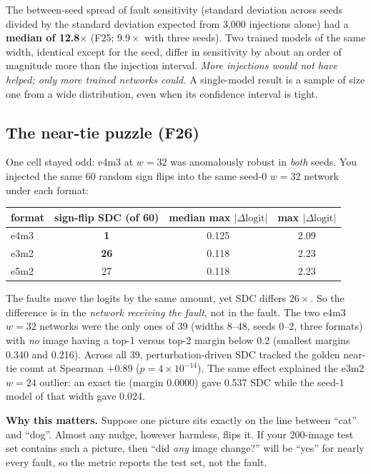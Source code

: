 The between-seed spread of fault sensitivity (standard deviation across seeds divided by the standard deviation expected from 3{,}000 injections alone) had a \textbf{median of 12.8$\times$} (F25; $9.9\times$ with three seeds). Two trained models of the same width, identical except for the seed, differ in sensitivity by about an order of magnitude more than the injection interval.
\emph{More injections would not have helped; only more trained networks could.} A single-model result is a sample of size one from a wide distribution, even when its confidence interval is tight.

\subsection{The near-tie puzzle (F26)}
One cell stayed odd: e4m3 at $w=32$ was anomalously robust in \emph{both} seeds. You injected the same 60 random sign flips into the same seed-0 $w=32$ network under each format:
\begin{center}
\small
\begin{tabular}{lccc}
\toprule
format & sign-flip SDC (of 60) & median max $|\Delta\text{logit}|$ & max $|\Delta\text{logit}|$ \\
\midrule
e4m3 & \textbf{1} & 0.125 & 2.09 \\
e3m2 & \textbf{26} & 0.118 & 2.23 \\
e5m2 & 27 & 0.118 & 2.23 \\
\bottomrule
\end{tabular}
\end{center}
The faults move the logits by the same amount, yet SDC differs $26\times$. So the difference is in the \emph{network receiving the fault}, not in the fault. The two e4m3 $w=32$ networks were the only ones of 39 (widths 8--48, seeds 0--2, three formats) with \emph{no} image having a top-1 versus top-2 margin below 0.2
(smallest margins 0.340 and 0.216). Across all 39, perturbation-driven SDC tracked the golden near-tie count at Spearman $+0.89$ ($p=4\times10^{-14}$). The same effect explained the e3m2 $w=24$ outlier: an exact tie (margin 0.0000) gave 0.537 SDC while the seed-1 model of that width gave 0.024.

\begin{plain}
\textbf{Why this matters.} Suppose one picture sits exactly on the line between ``cat'' and ``dog''. Almost any nudge, however harmless, flips it. If your 200-image test set contains such a picture, then ``did \emph{any} image change?'' will be ``yes'' for nearly every fault, so the metric reports the test set, not the fault.
\end{plain}

